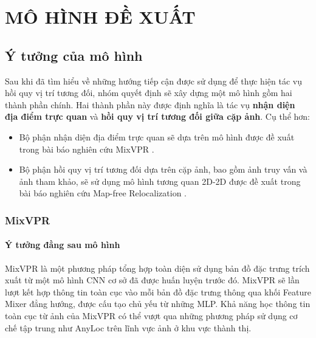 \chapter{MÔ HÌNH ĐỀ XUẤT}

\section{Ý tưởng của mô hình}
Sau khi đã tìm hiểu về những hướng tiếp cận được sử dụng để thực hiện tác vụ hồi quy vị trí tương đối, nhóm quyết định sẽ xây dựng một mô hình gồm hai thành phần chính. Hai thành phần này được định nghĩa là tác vụ \textbf{nhận diện địa điểm trực quan} và \textbf{hồi quy vị trí tương đối giữa cặp ảnh}. Cụ thể hơn:
\begin{itemize}
    \item Bộ phận nhận diện địa điểm trực quan sẽ dựa trên mô hình được đề xuất trong bài báo nghiên cứu MixVPR \cite{alibey2023mixvpr}.
    \item Bộ phận hồi quy vị trí tương đối dựa trên cặp ảnh, bao gồm ảnh truy vấn và ảnh tham khảo, sẽ sử dụng mô hình tương quan 2D-2D được đề xuất trong bài báo nghiên cứu Map-free Relocalization \cite{arnold2022mapfree}.
\end{itemize}

\subsection{MixVPR \cite{alibey2023mixvpr}}
\subsubsection*{Ý tưởng đằng sau mô hình}
MixVPR là một phương pháp tổng hợp toàn diện sử dụng bản đồ đặc trưng trích xuất từ một mô hình CNN cơ sở đã được huấn luyện trước đó. MixVPR sẽ lần lượt kết hợp thông tin toàn cục vào mỗi bản đồ đặc trưng thông qua khối Feature Mixer đẳng hướng, được cấu tạo chủ yếu từ những MLP. Khả năng học thông tin toàn cục từ ảnh của MixVPR có thể vượt qua những phương pháp sử dụng cơ chế tập trung như AnyLoc \cite{keetha2023anyloc} trên lĩnh vực ảnh ở khu vực thành thị.

